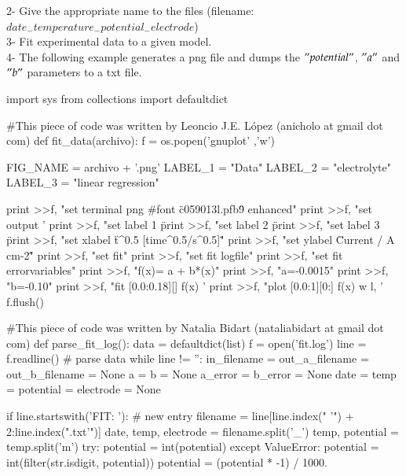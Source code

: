\documentclass[a4paper]{article}
\begin{document}
2- Give the appropriate name to the files (filename:$date_{-}temperature_{-}potential_{-}electrode$)\\

3- Fit experimental data to a given model.\\

4- The following example generates a png file and dumps the $"potential"$, $"a"$ and $"b"$ parameters to a txt file.\\
 
\begin{python}
import sys
from collections import defaultdict

#This piece of code was written by Leoncio J.E. L\'opez (anicholo at gmail dot com) 
def fit_data(archivo):
    f = os.popen('gnuplot' ,'w')

    FIG_NAME = archivo + '.png'
    LABEL_1 = "Data"
    LABEL_2 = "electrolyte"
    LABEL_3 = "linear regression"

    print >>f, "set terminal png #font \"c059013l.pfb\" 9 enhanced"
    print >>f, "set output '%
    print >>f, "set label 1 \"%
    print >>f, "set label 2 \"%
    print >>f, "set label 3 \"%
    print >>f, "set xlabel \"t^0.5 [time^0.5/s^0.5]\""
    print >>f, "set ylabel \"Current / A cm-2\""
    print >>f, "set fit"
    print >>f, "set fit logfile"
    print >>f, "set fit errorvariables"
    print >>f, "f(x)= a + b*(x)"
    print >>f, "a=-0.0015"
    print >>f, "b=-0.10"
    print >>f, "fit [0.0:0.18][] f(x) '%
    print >>f, "plot [0.0:1][0:] f(x) w l, '%
    f.flush()

#This piece of code was written by Natalia Bidart (nataliabidart at gmail dot com)
def parse_fit_log():
    data = defaultdict(list)
    f = open('fit.log')
    line = f.readline()
    # parse data
    while line != '':
        in_filename = out_a_filename = out_b_filename = None
        a = b = None
        a_error = b_error = None
        date = temp = potential = electrode = None

        if line.startswith('FIT: '): # new entry
            filename = line[line.index(" '") + 2:line.index(".txt'")]
            date, temp, electrode = filename.split('_')
            temp, potential = temp.split('m')
            try:
                potential = int(potential)
            except ValueError:
                potential = int(filter(str.isdigit, potential))
            potential = (potential * -1) / 1000.


\end{python}
\end{document}
